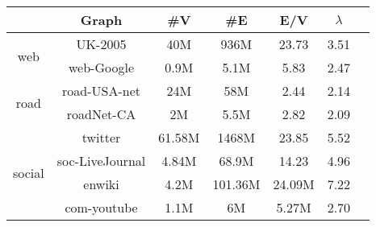 \begin{table}[htb]
  \centering
  \label{tab:experimental_data_set}
    \begin{tabular}{ccccccc}
     \toprule[1.5pt]
     & \textbf{Graph} & \textbf{\#V} & \textbf{\#E} & \textbf{E/V} & \textbf{$\lambda$} } \\
     \midrule[1pt]
     \multirow{2}{*}{web} & UK-2005 & 40M & 936M & 23.73 & 3.51  \\
                                         & web-Google & 0.9M & 5.1M & 5.83 & 2.47 \\
     \cmidrule(lr){1-6}
      \multirow{2}{*}{road} & road-USA-net & 24M & 58M & 2.44 & 2.14 \\
                                          & roadNet-CA & 2M & 5.5M & 2.82 & 2.09 \\
      \cmidrule(lr){1-6}
      \multirow{4}{*}{social} & twitter & 61.58M & 1468M & 23.85 & 5.52 \\
                                          & soc-LiveJournal & 4.84M & 68.9M & 14.23 & 4.96 \\
                                          & enwiki & 4.2M & 101.36M & 24.09M & 7.22 \\
                                          & com-youtube & 1.1M & 6M & 5.27M & 2.70 \\
     \bottomrule[1.5pt]
    \end{tabular}
\end{table}


